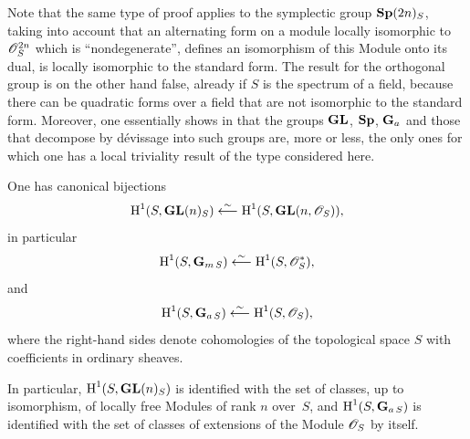 \begin{remark}
\label{XI.5.2}
Note that the same type of proof applies to the
symplectic group $\operatorname{\mathbf{Sp}}(2n)_S$, taking into account that an alternating
form on a module locally isomorphic to
$\cal{O}_S^{2n}$ which is ``nondegenerate'',
\ie defines an isomorphism of this Module onto its dual, is
locally isomorphic to the standard form. The result for the
orthogonal group is on the other hand false, already if $S$ is the
spectrum of a field, because there can be
quadratic forms over a field that are not isomorphic to the
standard form. Moreover, one essentially shows in \cite{XI.3} that the
groups $\operatorname{\mathbf{GL}}$, $\operatorname{\mathbf{Sp}}$, $\mathbf{G}_a$ and those that decompose by d\'evissage into such
groups are, more or less, the only ones for which one
has a local triviality result of the type considered
here.
\end{remark}

\begin{corollary}
\label{XI.5.3}
One has canonical bijections
$$
\H^1(S,\GL(n)_S)\isomfrom \H^1(S,\GL(n,\cal{O}_S))\quoi,
$$
in particular
$$
\H^1(S,\GG_{m\,S})\isomfrom \H^1(S,\cal{O}_S^*)\quoi,
$$
and
$$
\H^1(S,\GG_{a\,S})\isomfrom \H^1(S,\cal{O}_S)\quoi,
$$
where the right-hand sides denote cohomologies of
the topological space $S$ with coefficients in ordinary
sheaves.
\end{corollary}

In particular, $\operatorname{H}^1(S,\operatorname{\mathbf{GL}}(n)_S)$ is identified with the set of
classes, up to isomorphism, of locally free Modules of
rank $n$ over~$S$, and $\operatorname{H}^1(S,\mathbf{G}_{a\,S})$ is identified with the set
of classes of extensions of the Module $\cal{O}_S$ by itself.
